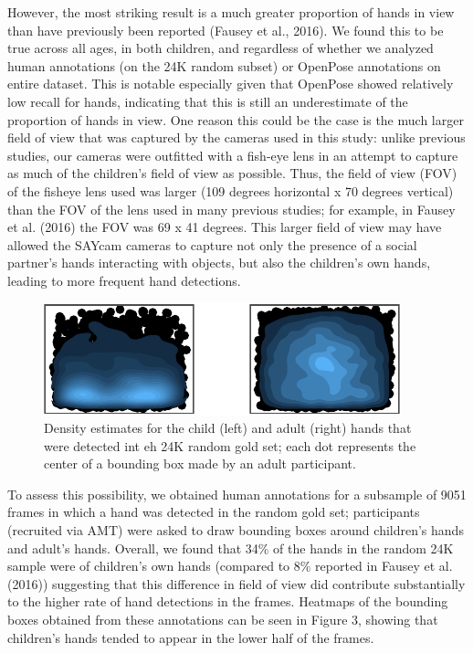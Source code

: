 \documentclass[10pt, letterpaper]{article}
\newenvironment{CodeChunk}{}{}
\begin{document}
However, the most striking result is a much greater proportion of hands
in view than have previously been reported (Fausey et al., 2016). We
found this to be true across all ages, in both children, and regardless
of whether we analyzed human annotations (on the 24K random subset) or
OpenPose annotations on entire dataset. This is notable especially given
that OpenPose showed relatively low recall for hands, indicating that
this is still an underestimate of the proportion of hands in view. One
reason this could be the case is the much larger field of view that was
captured by the cameras used in this study: unlike previous studies, our
cameras were outfitted with a fish-eye lens in an attempt to capture as
much of the children's field of view as possible. Thus, the field of
view (FOV) of the fisheye lens used was larger (109 degrees horizontal x
70 degrees vertical) than the FOV of the lens used in many previous
studies; for example, in Fausey et al. (2016) the FOV was 69 x 41
degrees. This larger field of view may have allowed the SAYcam cameras
to capture not only the presence of a social partner's hands interacting
with objects, but also the children's own hands, leading to more
frequent hand detections.

\begin{CodeChunk}
\begin{figure}[h]

{\centering \includegraphics{figs/density-1} 

}

\caption[Density estimates for the child (left) and adult (right) hands that were detected int eh 24K random gold set]{Density estimates for the child (left) and adult (right) hands that were detected int eh 24K random gold set; each dot represents the center of a bounding box made by an adult participant.}\label{fig:density}
\end{figure}
\end{CodeChunk}

To assess this possibility, we obtained human annotations for a
subsample of 9051 frames in which a hand was detected in the random gold
set; participants (recruited via AMT) were asked to draw bounding boxes
around children's hands and adult's hands. Overall, we found that 34\%
of the hands in the random 24K sample were of children's own hands
(compared to 8\% reported in Fausey et al. (2016)) suggesting that this
difference in field of view did contribute substantially to the higher
rate of hand detections in the frames. Heatmaps of the bounding boxes
obtained from these annotations can be seen in Figure 3, showing that
children's hands tended to appear in the lower half of the frames.
\end{document}
